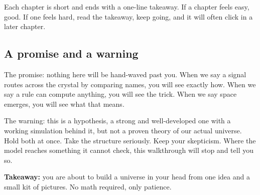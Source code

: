 Each chapter is short and ends with a one-line takeaway. If a chapter feels easy, good. If one feels hard, read the takeaway, keep going, and it will often click in a later chapter.

\subsection{A promise and a warning}

The promise: nothing here will be hand-waved past you. When we say a signal routes across the crystal by comparing names, you will see exactly how. When we say a rule can compute anything, you will see the trick. When we say space emerges, you will see what that means.

The warning: this is a hypothesis, a strong and well-developed one with a working simulation behind it, but not a proven theory of our actual universe. Hold both at once. Take the structure seriously. Keep your skepticism. Where the model reaches something it cannot check, this walkthrough will stop and tell you so.

\textbf{Takeaway:} you are about to build a universe in your head from one idea and a small kit of pictures. No math required, only patience.
